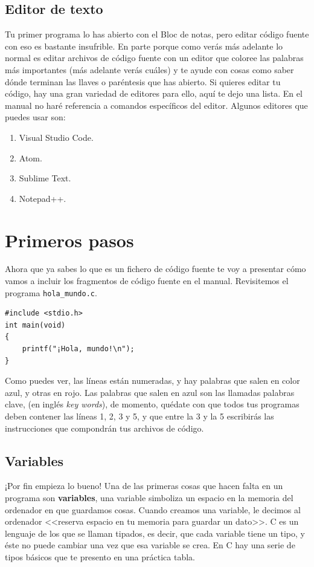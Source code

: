 \documentclass[a4paper]{article}
\begin{document}
\subsection{Editor de texto}
Tu primer programa lo has abierto con el Bloc de notas, pero editar código
fuente con eso es bastante insufrible. En parte porque como verás más adelante
lo normal es editar archivos de código fuente con un editor que coloree las
palabras más importantes (más adelante verás cuáles) y te ayude con cosas como
saber dónde terminan las llaves o paréntesis que has abierto. Si quieres
editar tu código, hay una gran variedad de editores para ello, aquí te dejo
una lista. En el manual no haré referencia a comandos específicos del editor.
Algunos editores que puedes usar son:
\begin{enumerate}
\item Visual Studio Code.
\item Atom.
\item Sublime Text.
\item Notepad++.
\end{enumerate}

\section{Primeros pasos}

Ahora que ya sabes lo que es un fichero de código fuente te voy a presentar
cómo vamos a incluir los fragmentos de código fuente en el manual.
Revisitemos el programa \verb!hola_mundo.c!.

\noindent
\begin{minipage}[H]{\linewidth}
\mbox{}
\begin{lstlisting}[style=C, caption={Hola Mundo en C},
label={lst:helloWorld}]
#include <stdio.h>
int main(void)
{
    printf("¡Hola, mundo!\n");
}
\end{lstlisting}
\end{minipage}

Como puedes ver, las líneas están numeradas, y hay palabras que salen en color
azul, y otras en rojo. Las palabras que salen en azul son las llamadas palabras
clave, (en inglés \textit{key words}), de momento, quédate con que todos tus
programas deben contener las líneas 1, 2, 3 y 5, y que entre la 3 y la 5
escribirás las instrucciones que compondrán tus archivos de código.
\subsection{Variables}
¡Por fin empieza lo bueno! Una de las primeras cosas que hacen falta en un
programa son \textbf{variables}, una variable simboliza un espacio en la
memoria del ordenador en que guardamos cosas. Cuando creamos una variable, le
decimos al ordenador <<reserva espacio en tu memoria para guardar un dato>>.
C es un lenguaje de los que se llaman tipados, es decir, que cada variable
tiene un tipo, y éste no puede cambiar una vez que esa variable se crea. En C
hay una serie de tipos básicos que te presento en una práctica tabla.
\end{document}
